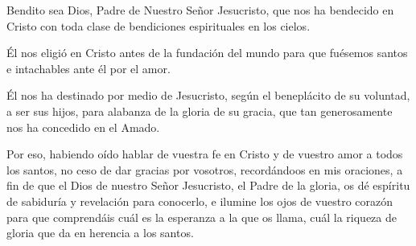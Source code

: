 
 


\begin{scripture}
	\begin{readprose}
		Bendito sea Dios, Padre de Nuestro Señor Jesucristo,
		que nos ha bendecido en Cristo 
		con toda clase de bendiciones espirituales en los cielos.
		
		Él nos eligió en Cristo antes de la fundación del mundo 
		para que fuésemos santos e intachables ante él por el amor.
		
		Él nos ha destinado por medio de Jesucristo, 
		según el beneplácito de su voluntad, 
		a ser sus hijos, 
		para alabanza de la gloria de su gracia, 
		que tan generosamente nos ha concedido en el Amado.
		
		Por eso, habiendo oído hablar de vuestra fe en Cristo y de vuestro amor a todos los santos, no ceso de dar gracias por vosotros, recordándoos en mis oraciones, a fin de que el Dios de nuestro Señor Jesucristo, el Padre de la gloria, os dé espíritu de sabiduría y revelación para conocerlo, e ilumine los ojos de vuestro corazón para que comprendáis cuál es la esperanza a la que os llama, cuál la riqueza de gloria que da en herencia a los santos.
	\end{readprose}
\end{scripture}



 


